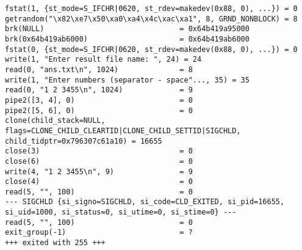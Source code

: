 \begin{verbatim}
fstat(1, {st_mode=S_IFCHR|0620, st_rdev=makedev(0x88, 0), ...}) = 0
getrandom("\x82\xe7\x50\xa0\xa4\x4c\xac\xa1", 8, GRND_NONBLOCK) = 8
brk(NULL)                               = 0x64b419a95000
brk(0x64b419ab6000)                     = 0x64b419ab6000
fstat(0, {st_mode=S_IFCHR|0620, st_rdev=makedev(0x88, 0), ...}) = 0
write(1, "Enter result file name: ", 24) = 24
read(0, "ans.txt\n", 1024)              = 8
write(1, "Enter numbers (separator - space"..., 35) = 35
read(0, "1 2 3455\n", 1024)             = 9
pipe2([3, 4], 0)                        = 0
pipe2([5, 6], 0)                        = 0
clone(child_stack=NULL, flags=CLONE_CHILD_CLEARTID|CLONE_CHILD_SETTID|SIGCHLD, child_tidptr=0x796307c61a10) = 16655
close(3)                                = 0
close(6)                                = 0
write(4, "1 2 3455\n", 9)               = 9
close(4)                                = 0
read(5, "", 100)                        = 0
--- SIGCHLD {si_signo=SIGCHLD, si_code=CLD_EXITED, si_pid=16655, si_uid=1000, si_status=0, si_utime=0, si_stime=0} ---
read(5, "", 100)                        = 0
exit_group(-1)                          = ?
+++ exited with 255 +++
\end{verbatim}